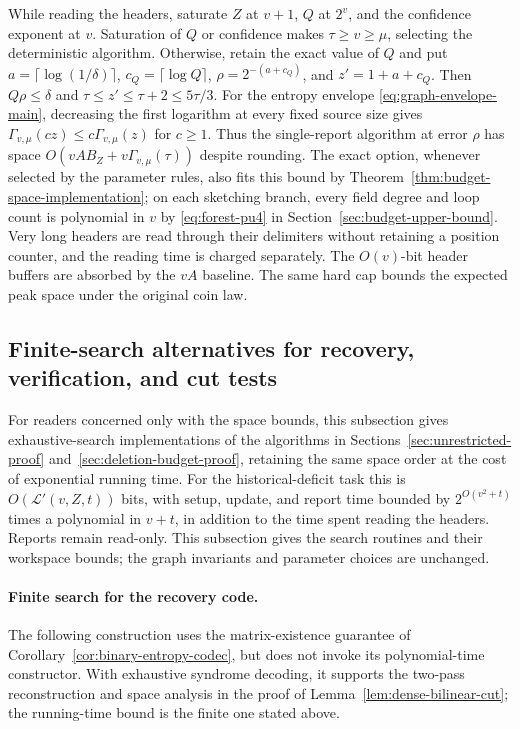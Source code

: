 \documentclass[11pt,letterpaper]{article}
\numberwithin{equation}{section}
\begin{document}
While reading the headers, saturate $Z$ at $v+1$, $Q$ at $2^v$, and the confidence exponent at $v$.
Saturation of $Q$ or confidence makes $\tau\ge v\ge\mu$, selecting the deterministic algorithm.
Otherwise, retain the exact value of $Q$ and put $a=\lceil\log(1/\delta)\rceil$, $c_Q=\lceil\log Q\rceil$, $\rho=2^{-(a+c_Q)}$, and $z'=1+a+c_Q$.
Then $Q\rho\le\delta$ and $\tau\le z'\le\tau+2\le5\tau/3$.
For the entropy envelope \eqref{eq:graph-envelope-main}, decreasing the first logarithm at every fixed source size gives $\Gamma_{v,\mu}(cz)\le c\Gamma_{v,\mu}(z)$ for $c\ge1$.
Thus the single-report algorithm at error $\rho$ has space $O(vAB_Z+v\Gamma_{v,\mu}(\tau))$ despite rounding.
The exact option, whenever selected by the parameter rules, also fits this bound by Theorem~\ref{thm:budget-space-implementation}; on each sketching branch, every field degree and loop count is polynomial in $v$ by \eqref{eq:forest-pu4} in Section~\ref{sec:budget-upper-bound}.
Very long headers are read through their delimiters without retaining a position counter, and the reading time is charged separately.
The $O(v)$-bit header buffers are absorbed by the $vA$ baseline.
The same hard cap bounds the expected peak space under the original coin law.



\subsection{Finite-search alternatives for recovery, verification, and cut tests}
\label{sec:finite-search-alternatives}

For readers concerned only with the space bounds, this subsection gives exhaustive-search implementations of the algorithms in Sections~\ref{sec:unrestricted-proof} and~\ref{sec:deletion-budget-proof}, retaining the same space order at the cost of exponential running time.
For the historical-deficit task this is $O(\mathcal L'(v,Z,t))$ bits, with setup, update, and report time bounded by $2^{O(v^2+t)}$ times a polynomial in $v+t$, in addition to the time spent reading the headers.
Reports remain read-only.
This subsection gives the search routines and their workspace bounds; the graph invariants and parameter choices are unchanged.

\paragraph{Finite search for the recovery code.}
\label{sec:finite-core-alternatives}
The following construction uses the matrix-existence guarantee of Corollary~\ref{cor:binary-entropy-codec}, but does not invoke its polynomial-time constructor.
With exhaustive syndrome decoding, it supports the two-pass reconstruction and space analysis in the proof of Lemma~\ref{lem:dense-bilinear-cut}; the running-time bound is the finite one stated above.
\end{document}
